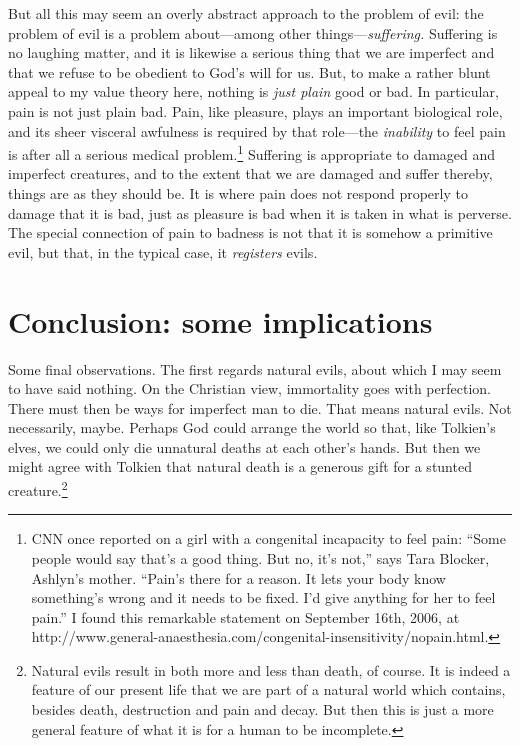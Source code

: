 \documentclass[11pt]{amsart}
\begin{document}
But all this may seem an overly abstract approach to the problem of evil: the problem of evil is a problem about---among other things---\emph{suffering.} Suffering is no laughing matter, and it is likewise a serious thing that we are imperfect and that we refuse to be obedient to God's will for us. But, to make a rather blunt appeal to my value theory here, nothing is \emph{just plain} good or bad. In particular, pain is not just plain bad. Pain, like pleasure, plays an important biological role, and its sheer visceral awfulness is required by that role---the \emph{inability} to feel pain is after all a serious medical problem.\footnote{CNN once reported on a girl with a congenital incapacity to feel pain: ``Some people would say that's a good thing. But no, it's not,'' says Tara Blocker, Ashlyn's mother. ``Pain's there for a reason. It lets your body know something's wrong and it needs to be fixed. I'd give anything for her to feel pain.'' 
I found this remarkable statement on September 16th, 2006, at http://www.general-anaesthesia.com/congenital-insensitivity/nopain.html.} Suffering is appropriate to damaged and imperfect creatures, and to the extent that we are damaged and suffer thereby, things are as they should be. It is where pain does not respond properly to damage that it is bad, just as pleasure is bad when it is taken in what is perverse. The special connection of pain to badness is not that it is somehow a primitive evil, but that, in the typical case, it \emph{registers} evils.



\section{Conclusion: some implications}


Some final observations. The first regards natural evils, about which I may seem to have said nothing. On the Christian view, immortality goes with perfection. There must then be ways for imperfect man to die. That means natural evils. Not necessarily, maybe. Perhaps God could arrange the world so that, like Tolkien's elves, we could only die unnatural deaths at each other's hands. But then we might agree with Tolkien that natural death is a generous gift for a stunted creature.\footnote{Natural evils result in both more and less than death, of course. It is indeed a feature of our present life that we are part of a natural world which contains, besides death, destruction and pain and decay. But then this is just a more general feature of what it is for a human to be incomplete.}
\end{document}
